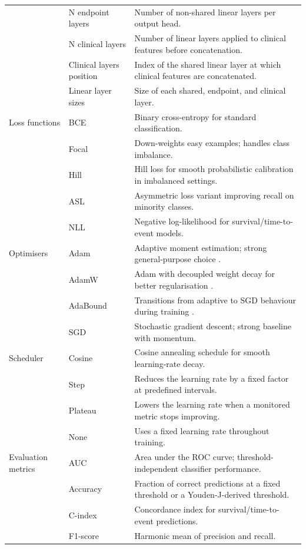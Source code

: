 \documentclass[11pt]{article}
\begin{document}
\begin{longtable}{P{0.16\textwidth}P{0.18\textwidth}P{0.58\textwidth}}
 & N endpoint layers & Number of non-shared linear layers per output head. \\
 & N clinical layers & Number of linear layers applied to clinical features before concatenation. \\
 & Clinical layers position & Index of the shared linear layer at which clinical features are concatenated. \\
 & Linear layer sizes & Size of each shared, endpoint, and clinical layer. \\
\hline
Loss functions & BCE & Binary cross-entropy for standard classification. \\
 & Focal & Down-weights easy examples; handles class imbalance. \\
 & Hill & Hill loss for smooth probabilistic calibration in imbalanced settings. \\
 & ASL & Asymmetric loss variant improving recall on minority classes. \\
 & NLL & Negative log-likelihood for survival/time-to-event models. \\
\hline
Optimisers & Adam & Adaptive moment estimation; strong general-purpose choice \cite{Kingma2017}. \\
 & AdamW & Adam with decoupled weight decay for better regularisation \cite{Loshchilov2019}. \\
 & AdaBound & Transitions from adaptive to SGD behaviour during training \cite{Luo2019}. \\
 & SGD & Stochastic gradient descent; strong baseline with momentum. \\
\hline
Scheduler & Cosine & Cosine annealing schedule for smooth learning-rate decay. \\
 & Step & Reduces the learning rate by a fixed factor at predefined intervals. \\
 & Plateau & Lowers the learning rate when a monitored metric stops improving. \\
 & None & Uses a fixed learning rate throughout training. \\
\hline
Evaluation metrics & AUC & Area under the ROC curve; threshold-independent classifier performance. \\
 & Accuracy & Fraction of correct predictions at a fixed threshold or a Youden-J-derived threshold. \\
 & C-index & Concordance index for survival/time-to-event predictions. \\
 & F1-score & Harmonic mean of precision and recall. \\

\end{longtable}
\end{document}
